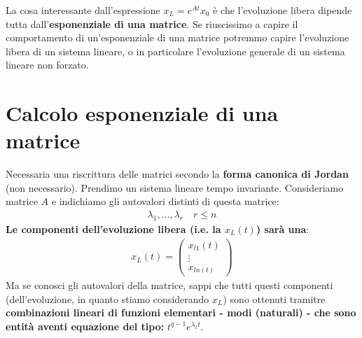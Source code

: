 \documentclass[a4paper]{report}
\begin{document}
\bb
La cosa interessante dall'espressione $x_L = e^{At} x_0$
è che l'evoluzione libera dipende tutta dall'\textbf{esponenziale di una matrice}. Se riuscissimo a capire il comportamento di un'esponenziale di una matrice potremmo capire l'evoluzione libera di un sistema lineare, o in particolare l'evoluzione generale di un sistema lineare non forzato.
\bb
\section{Calcolo esponenziale di una matrice}
Necessaria una riscrittura delle matrici secondo la \textbf{forma canonica di Jordan} (non necessario).
\bb
Prendimo un sistema lineare tempo invariante. Consideriamo matrice $A$ e indichiamo gli autovalori distinti di questa matrice:
\begin{align*}
	\lambda_1, \ldots, \lambda_r \quad r \leq n
\end{align*}
\textbf{Le componenti dell'evoluzione libera (i.e. la $x_L(t)$) sarà una}:
\begin{align*}
	x_L(t) = \begin{pmatrix}
		x_{l1}(t) \\ \vdots \\ x_{ln(t)}
	\end{pmatrix}
\end{align*}
Ma se conosci gli autovalori della matrice, sappi che tutti questi componenti (dell'evoluzione, in quanto stiamo considerando $x_L$) sono ottenuti tramitre \textbf{combinazioni lineari di funzioni elementari - modi (naturali) - che sono entità aventi equazione del tipo:} $t^{q-1}e^{\lambda_1t}$.
\end{document}
